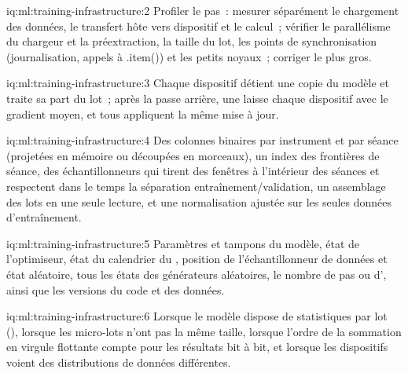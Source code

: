 \begin{solution}{iq:ml:training-infrastructure:2}
Profiler le pas~: mesurer séparément le chargement des données, le transfert hôte vers dispositif et le calcul~; vérifier le parallélisme du chargeur et la préextraction,
la taille du lot, les points de synchronisation (journalisation, appels à .item()) et les petits noyaux~; corriger le plus gros.
\end{solution}

\begin{solution}{iq:ml:training-infrastructure:3}
Chaque dispositif détient une copie du modèle et traite sa part du lot~; après la passe arrière, une  laisse chaque dispositif
avec le gradient moyen, et tous appliquent la même mise à jour.
\end{solution}

\begin{solution}{iq:ml:training-infrastructure:4}
Des colonnes binaires par instrument et par séance (projetées en mémoire ou découpées en morceaux), un index des frontières de séance, des échantillonneurs qui tirent des fenêtres
à l'intérieur des séances et respectent dans le temps la séparation entraînement/validation, un assemblage des lots en une seule lecture, et une normalisation ajustée sur les
seules données d'entraînement.
\end{solution}

\begin{solution}{iq:ml:training-infrastructure:5}
Paramètres et tampons du modèle, état de l'optimiseur, état du calendrier du , position de l'échantillonneur de données et état aléatoire, tous les
états des générateurs aléatoires, le nombre de pas ou d', ainsi que les versions du code et des données.
\end{solution}

\begin{solution}{iq:ml:training-infrastructure:6}
Lorsque le modèle dispose de statistiques par lot (), lorsque les micro-lots n'ont pas la même taille, lorsque l'ordre de
la sommation en virgule flottante compte pour les résultats bit à bit, et lorsque les dispositifs voient des distributions de données différentes.
\end{solution}
